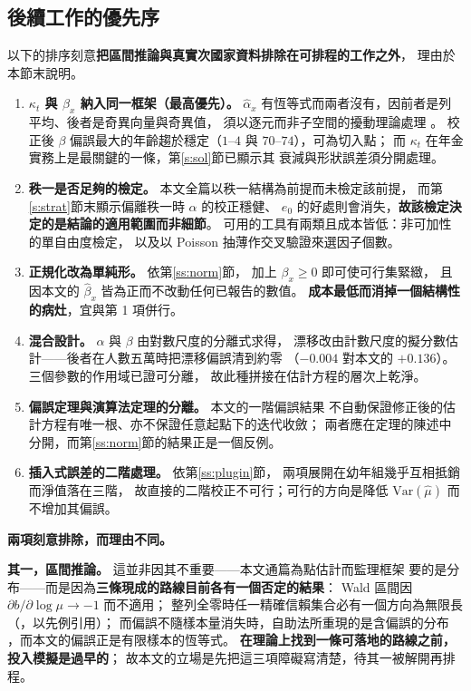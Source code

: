\documentclass[UTF8, fontset=macnew, a4paper, 12pt]{ctexart}
\begin{document}
\subsection{後續工作的優先序}

以下的排序刻意\textbf{把區間推論與真實次國家資料排除在可排程的工作之外}，
理由於本節末說明。

\begin{enumerate}[label=\arabic*.]
\item \textbf{$\kappa_t$ 與 $\beta_x$ 納入同一框架（最高優先）。}
$\hat\alpha_x$ 有恆等式而兩者沒有，因前者是列平均、後者是奇異向量與奇異值，
須以逐元而非子空間的擾動理論處理 \citep{abbe2020}。
校正後 $\beta$ 偏誤最大的年齡趨於穩定（$1$--$4$ 與 $70$--$74$），可為切入點；
而 $\kappa_t$ 在年金實務上是最關鍵的一條，第\ref{s:sol}節已顯示其
衰減與形狀誤差須分開處理。
\item \textbf{秩一是否足夠的檢定。} 本文全篇以秩一結構為前提而未檢定該前提，
而第\ref{s:strat}節末顯示偏離秩一時 $\alpha$ 的校正穩健、
$e_0$ 的好處則會消失，\textbf{故該檢定決定的是結論的適用範圍而非細節}。
可用的工具有兩類且成本皆低：非可加性的單自由度檢定，
以及以 Poisson 抽薄作交叉驗證來選因子個數。
\item \textbf{正規化改為單純形。} 依第\ref{ss:norm}節，
加上 $\beta_x\ge0$ 即可使可行集緊緻，
且因本文的 $\hat\beta_x$ 皆為正而不改動任何已報告的數值。
\textbf{成本最低而消掉一個結構性的病灶}，宜與第 1 項併行。
\item \textbf{混合設計。} $\alpha$ 與 $\beta$ 由對數尺度的分離式求得，
漂移改由計數尺度的擬分數估計——後者在人數五萬時把漂移偏誤清到約零
（$-0.004$ 對本文的 $+0.136$）。三個參數的作用域已證可分離，
故此種拼接在估計方程的層次上乾淨。
\item \textbf{偏誤定理與演算法定理的分離。} 本文的一階偏誤結果
不自動保證修正後的估計方程有唯一根、亦不保證任意起點下的迭代收斂；
兩者應在定理的陳述中分開，而第\ref{ss:norm}節的結果正是一個反例。
\item \textbf{插入式誤差的二階處理。} 依第\ref{ss:plugin}節，
兩項展開在幼年組幾乎互相抵銷而淨值落在三階，
故直接的二階校正不可行；可行的方向是降低 $\mathrm{Var}(\hat\mu)$
而不增加其偏誤。
\end{enumerate}

\textbf{兩項刻意排除，而理由不同。}

\textbf{其一，區間推論。} 這並非因其不重要——本文通篇為點估計而監理框架
要的是分布——而是因為\textbf{三條現成的路線目前各有一個否定的結果}：
Wald 區間因 $\partial b/\partial\log\mu\to-1$ 而不適用；
整列全零時任一精確信賴集合必有一個方向為無限長
（\citealp{lewis2024}，以先例引用）；
而偏誤不隨樣本量消失時，自助法所重現的是含偏誤的分布
\citep{cavaliere2024}，而本文的偏誤正是有限樣本的恆等式。
\textbf{在理論上找到一條可落地的路線之前，投入模擬是過早的}；
故本文的立場是先把這三項障礙寫清楚，待其一被解開再排程。
\end{document}
